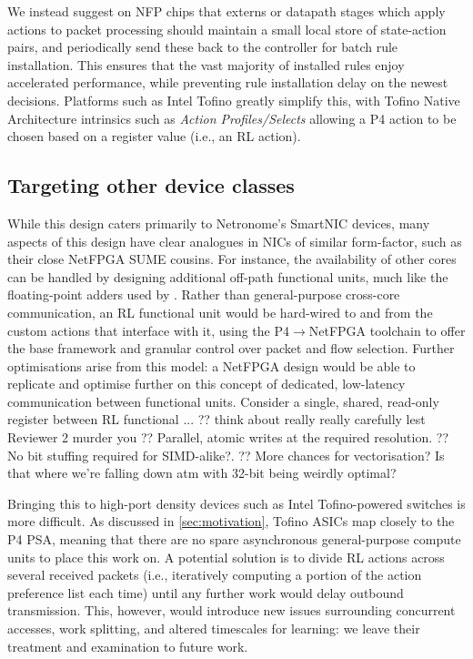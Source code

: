 \documentclass[sigconf,natbib=false]{acmart}
\begin{document}
We instead suggest on NFP chips that externs or datapath stages which apply actions to packet processing should maintain a small local store of state-action pairs, and periodically send these back to the controller for batch rule installation.
This ensures that the vast majority of installed rules enjoy accelerated performance, while preventing rule installation delay on the newest decisions.
Platforms such as Intel Tofino greatly simplify this, with Tofino Native Architecture intrinsics such as \emph{Action Profiles/Selects} allowing a P4 action to be chosen based on a register value (i.e., an RL action).

\subsection{Targeting other device classes}
While this design caters primarily to Netronome's SmartNIC devices, many aspects of this design have clear analogues in NICs of similar form-factor, such as their close NetFPGA SUME cousins.
For instance, the availability of other cores can be handled by designing additional off-path functional units, much like the floating-point adders used by \textcite{DBLP:conf/isca/LiLYCSH19}.
Rather than general-purpose cross-core communication, an RL functional unit would be hard-wired to and from the custom actions that interface with it, using the P4$\rightarrow$NetFPGA toolchain to offer the base framework and granular control over packet and flow selection.
Further optimisations arise from this model: a NetFPGA design would be able to replicate and optimise further on this concept of dedicated, low-latency communication between functional units.
Consider a single, shared, read-only register between RL functional ...
?? think about really really carefully lest Reviewer 2 murder you
?? Parallel, atomic writes at the required resolution.
?? No bit stuffing required for SIMD-alike?.
?? More chances for vectorisation? Is that where we're falling down atm with 32-bit being weirdly optimal?

Bringing this to high-port density devices such as Intel Tofino-powered switches is more difficult.
As discussed in \cref{sec:motivation}, Tofino ASICs map closely to the P4 PSA, meaning that there are no spare asynchronous general-purpose compute units to place this work on.
A potential solution is to divide RL actions across several received packets (i.e., iteratively computing a portion of the action preference list each time) until any further work would delay outbound transmission.
This, however, would introduce new issues surrounding concurrent accesses, work splitting, and altered timescales for learning: we leave their treatment and examination to future work.
\end{document}
